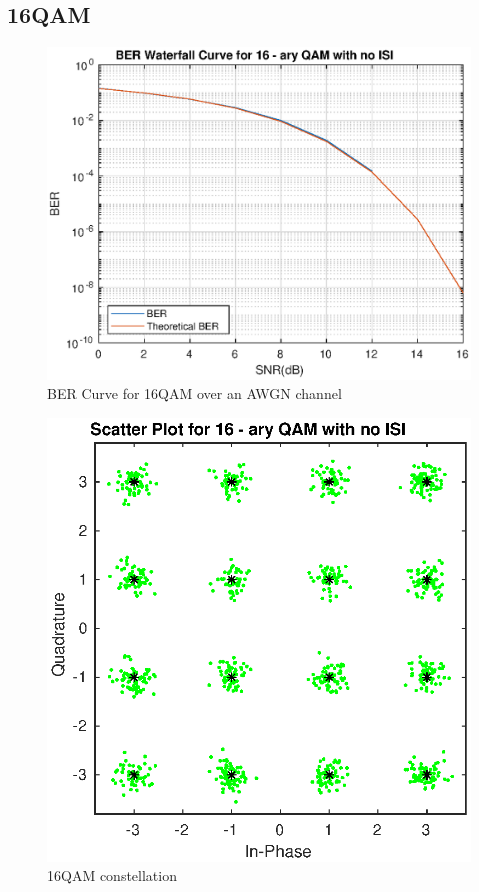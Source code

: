 \documentclass[conference]{IEEEtran}
\begin{document}
\subsection{16QAM}
\begin{figure}[htbp]
\centerline{\includegraphics[scale=.5]{./media/16qam.eps}}
\caption{BER Curve for 16QAM over an AWGN channel}
\label{16ber}
\end{figure}
\begin{figure}[htbp]
\centerline{\includegraphics[scale=.5]{./media/16qam_scatter.eps}}
\caption{16QAM constellation}
\label{16star}
\end{figure}
\end{document}

